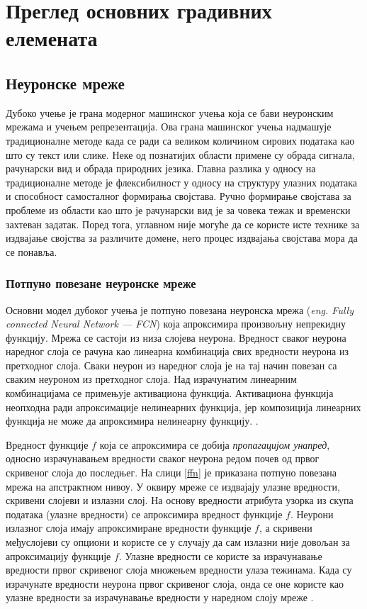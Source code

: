 \documentclass[11pt,oneside]{memoir}
\begin{document}
\chapter{Преглед основних градивних елемената}
\label{chp:razrada}

\section{Неуронске мреже}

Дубоко учење је грана модерног машинског учења која се бави неуронским мрежама и учењем репрезентација. 
Ова грана машинског учења надмашује традиционалне методе када се ради са великом количином сирових података
као што су текст или слике. 
Неке од познатијих области примене су обрада сигнала, рачунарски вид и обрада природних језика. 
Главна разлика у односу на традиционалне методе је флексибилност у односу на структуру улазних података и
способност самосталног формирања својстава. Ручно формирање својстава за проблеме из области као што је рачунарски вид је за човека тежак
и временски захтеван задатак. Поред тога, углавном није могуће да се користе исте технике за издвајање својства за различите домене, него
процес издвајања својстава мора да се понавља.

\subsection{Потпуно повезане неуронске мреже}

Основни модел дубоког учења је потпуно повезана неуронска мрежа (\textit{eng. Fully connected Neural Network --- FCN}) која
апроксимира произвољну непрекидну функцију. Мрежа се састоји из
низа слојева неурона. Вредност сваког неурона наредног слоја се рачуна као линеарна комбинација свих вредности неурона из претходног слоја. 
Сваки неурон из наредног слоја је на тај начин повезан са сваким неуроном из претходног слоја. Над израчунатим линеарним комбинацијама се примењује
активациона функција. Активациона функција неопходна ради апроксимације нелинеарних функција, јер композиција линеарних функција не може
да апроксимира нелинеарну функцију.  \cite{deep_learning_goodfellow, ml_mladen}.

Вредност функције $f$ која 
се апроксимира се добија \textit{пропагацијом унапред}, односно израчунавањем вредности сваког неурона редом почев од
првог скривеног слоја до последњег. На слици
\ref{ffn} је приказана потпуно повезана мрежа на апстрактном нивоу.
У оквиру мреже се издвајају улазне вредности, скривени слојеви и излазни слој. На основу
вредности атрибута узорка из скупа података (улазне вредности) се апроксимира вредност функције $f$. Неурони излазног слоја имају апроксимиране вредности функције $f$, а
скривени међуслојеви су опциони и користе се у случају да сам излазни није довољан за апроксимацију функције $f$.
Улазне вредности се користе за израчунавање вредности првог скривеног слоја множењем вредности улаза тежинама. Када су израчунате вредности неурона првог скривеног слоја, онда се оне користе као улазне вредности за израчунавање
вредности у наредном слоју мреже \cite{deep_learning_goodfellow}.
\end{document}

